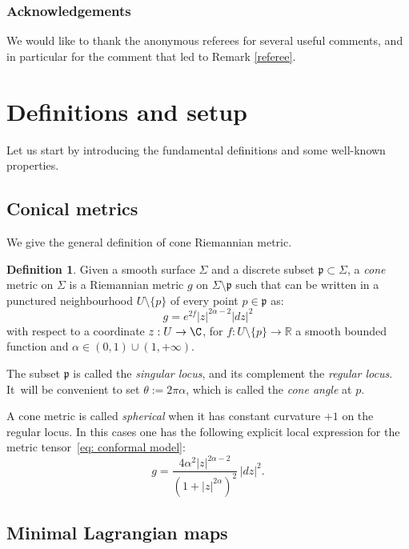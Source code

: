 \documentclass[JEP,XML,SOM,Unicode,NoEqCountersInSection,published]{cedram}
\theoremstyle{definition}
\newtheorem{defi}[cor]{Definition}
\newcommand{\R}{{\mathbb R}}
\begin{document}
\subsubsection*{Acknowledgements}
We would like to thank the anonymous referees for several useful comments, and in particular for the comment that led to Remark \ref{referee}.

\section{Definitions and setup}

Let us start by introducing the fundamental definitions and some well-known properties.

\subsection{Conical metrics}
We give the general definition of cone Riemannian metric.

\begin{defi} \label{defi cone sing}
Given a smooth surface $\Sigma$ and a discrete subset $\mathfrak p\subset \Sigma$, a \emph{cone} metric on $\Sigma$ is a Riemannian metric $g$ on $\Sigma\setminus \mathfrak p$ such that can be written in a punctured neighbourhood $U\setminus\{p\}$ of every point $p\in \mathfrak p$ as:
\begin{equation} \label{eq: conformal model}
g=e^{2f}|z|^{2\alpha-2}|dz|^2
\end{equation}
with respect to a coordinate $z:U\to\C$, for $f:U\setminus \{p\}\to\R$ a smooth bounded function and $\alpha\in (0,1)\cup (1,+\infty)$.
\end{defi}

The subset $\mathfrak p$ is called the \emph{singular locus}, and its complement the \emph{regular locus}. It~will be convenient to set $\theta:=2\pi\alpha$, which is called the \emph{cone angle} at $p$.

A cone metric is called \emph{spherical} when it has constant curvature $+1$ on the regular locus. In this cases one has the following explicit local expression for the metric tensor~\eqref{eq: conformal model}:
\begin{equation}\label{eq:spherical cone metric}
g=\frac{4\alpha^2|z|^{2\alpha-2}}{(1+|z|^{2\alpha})^2}\,|dz|^2.
\end{equation}

\subsection{Minimal Lagrangian maps}
\end{document}
